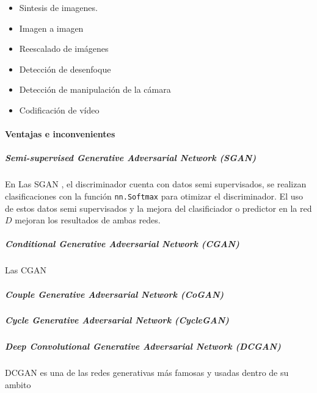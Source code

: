 \begin{itemize}
    \item Sintesis de imagenes.
    \item Imagen a imagen
    \item Reescalado de imágenes
    \item Detección de desenfoque
    \item Detección de manipulación de la cámara
    \item Codificación de vídeo
\end{itemize}
\paragraph*{Ventajas e inconvenientes}



\subparagraph*{Semi-supervised Generative Adversarial Network (SGAN)}
En Las \gls{SGAN} \cite{SGAN-odena2016semisupervised}, el discriminador cuenta con datos semi supervisados, se realizan clasificaciones con la función \texttt{nn.Softmax} para otimizar el discriminador.
El uso de estos datos semi supervisados y la mejora del clasificiador o predictor en la red $D$ mejoran los resultados de ambas redes.

\subparagraph*{Conditional Generative Adversarial Network (CGAN)}
Las \gls{CGAN} \cite{CGAN}

\subparagraph*{Couple Generative Adversarial Network (CoGAN)}

\subparagraph*{Cycle Generative Adversarial Network (CycleGAN)}

\subparagraph*{Deep Convolutional Generative Adversarial Network (DCGAN)}
\gls{DCGAN} es una de las redes generativas más famosas y usadas dentro de su ambito

